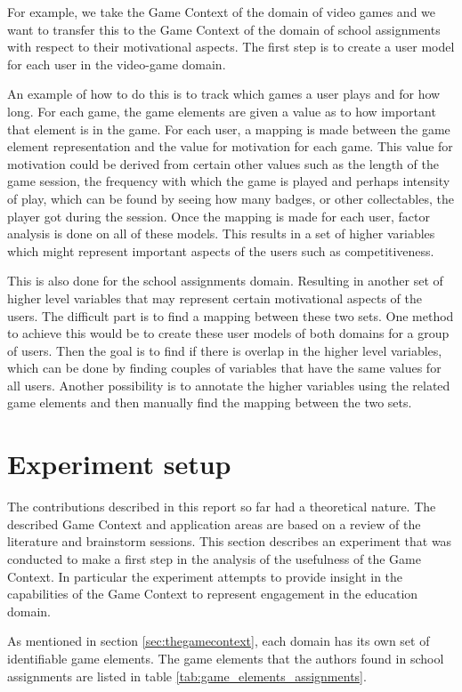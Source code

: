 \documentclass[11pt]{article}
\begin{document}
For example, we take the Game Context of the domain of video games and we want to transfer this to the Game Context of the domain of school assignments with respect to their motivational aspects. The first step is to create a user model for each user in the video-game domain. 

An example of how to do this is to track which games a user plays and for how long. For each game, the game elements are given a value as to how important that element is in the game. For each user, a mapping is made between the game element representation and the value for motivation for each game. This value for motivation could be derived from certain other values such as the length of the game session, the frequency with which the game is played and perhaps intensity of play, which can be found by seeing how many badges, or other collectables, the player got during the session. Once the mapping is made for each user, factor analysis is done on all of these models. This results in a set of higher variables which might represent important aspects of the users such as competitiveness.

This is also done for the school assignments domain. Resulting in another set of higher level variables that may represent certain motivational aspects of the users. The difficult part is to find a mapping between these two sets. One method to achieve this would be to create these user models of both domains for a group of users. Then the goal is to find if there is overlap in the higher level variables, which can be done by finding couples of variables that have the same values for all users. Another possibility is to annotate the higher variables using the related game elements and then manually find the mapping between the two sets.

\section{Experiment setup}
The contributions described in this report so far had a theoretical nature. The described Game Context and application areas are based on a review of the literature and brainstorm sessions. This section describes an experiment that was conducted to make a first step in the analysis of the usefulness of the Game Context. In particular the experiment attempts to provide insight in the capabilities of the Game Context to represent engagement in the education domain. 

As mentioned in section \ref{sec:thegamecontext}, each domain has its own set of identifiable game elements. The game elements that the authors found in school assignments are listed in table \ref{tab:game_elements_assignments}.
\end{document}
